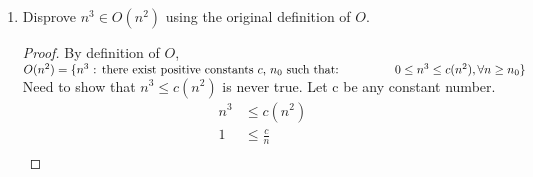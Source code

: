 \documentclass{article}
\begin{document}
\begin{enumerate}
\begin{proof}
                    Now, show that $n^2-3n-20\leq n^2$\\
                    Base case: $n=10$
                    \begin{align*}
                        (10)^2-3(10)-20 &\leq (10)^2 \\
                        100-30-20 &\leq 100\\
                        50 &\leq 100
                    \end{align*}
                    IH: Assume $k^2-3k-20\leq k^2$ for $k\geq 10$\\
                    Prove true for $k+1$.
                    \begin{align*}
                        (k+1)^2-3(k+1)-20 &\leq (k+1)^2 \\
                        k^2+2k+1-3k-3-20 &\leq (k+1)^2 \\
                        k^2-k-22 &\leq (k+1)^2 \\
                        k^2-k-22-2k+2k+2-2 &\leq (k+1)^2 \\
                        k^2-3k-20+2k-2 &\leq (k+1)^2 \\
                        k^2+2k-2 &\leq (k+1)^2 &&\text{Induction step}\\
                        k^2+2k-2 &\leq k^2+2k+1 \\
                        -2 &\leq 1
                    \end{align*}
                    This shows that $n^2-3n-20\in\Theta(n^2)$ is true with $c_1 = \frac{1}{2}$, $c_2 = 1$ for all $n \geq 10$
                \end{proof}
            \item Disprove $n^3\in O(n^2)$ using the original definition of $O$.
                \begin{proof}
                    By definition of $O$,\\$O(n^2) = \{n^3 \text{ : there exist positive constants } c \text{, } n_0 \text{ such that: }\\ 
                    \text{\hspace{1.5cm}}0\leq n^3\leq c(n^2), \forall n\geq n_0\}$\\
                    Need to show that $n^3\leq c(n^2)$ is never true. Let c be any constant number.
                    \begin{align*}
                        n^3 &\leq c(n^2)\\
                        1 &\leq \frac{c}{n} \\

\end{align*}
\end{proof}
\end{enumerate}
\end{document}
